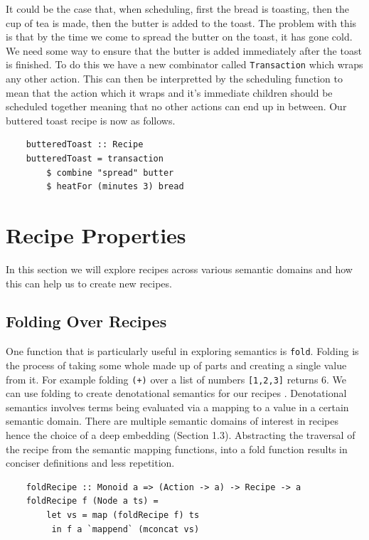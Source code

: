 \documentclass[11pt]{article}
\begin{document}
It could be the case that, when scheduling, first the bread is toasting, then the cup of tea is
made, then the butter is added to the toast. The problem with this is that by the time we come
to spread the butter on the toast, it has gone cold. We need some way to ensure that the butter
is added immediately after the toast is finished. To do this we have a new combinator called
\texttt{Transaction} which wraps any other action. This can then be interpretted by the scheduling
function to mean that the action which it wraps and it's immediate children should be scheduled
together meaning that no other actions can end up in between. Our buttered toast recipe is now
as follows.

\begin{lstlisting}
    butteredToast :: Recipe
    butteredToast = transaction
        $ combine "spread" butter
        $ heatFor (minutes 3) bread
\end{lstlisting}

\section{Recipe Properties}

In this section we will explore recipes across various semantic domains and how this can
help us to create new recipes.

\subsection{Folding Over Recipes}

One function that is particularly useful in exploring semantics is \texttt{fold}.
Folding is the process of taking some whole made up of parts and creating a single
value from it. For example folding \texttt{(+)} over a list of numbers \texttt{[1,2,3]}
returns 6. We can use folding to create denotational semantics for our recipes \cite{hutton}.
Denotational semantics involves terms being evaluated via a mapping to a value in a certain
semantic domain. There are multiple semantic domains of interest in recipes hence the choice
of a deep embedding (Section 1.3). Abstracting the traversal of the recipe from the
semantic mapping functions, into a fold function results in conciser definitions and
less repetition.

\begin{lstlisting}
    foldRecipe :: Monoid a => (Action -> a) -> Recipe -> a
    foldRecipe f (Node a ts) =
        let vs = map (foldRecipe f) ts
         in f a `mappend` (mconcat vs)
\end{lstlisting}
\end{document}
